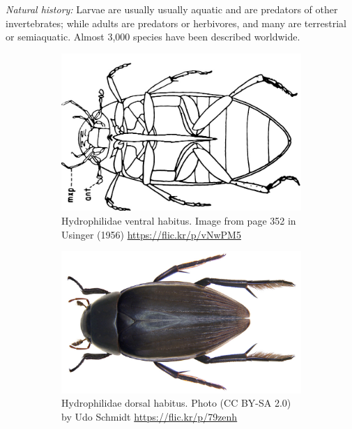 \documentclass[letterpaper, 11pt]{article}
\begin{document}
\noindent{}\textit{Natural history:} Larvae are usually usually aquatic and are predators of other invertebrates; while adults are predators or herbivores, and many are terrestrial or semiaquatic. Almost 3,000 species have been described worldwide.

\begin{figure}[ht!]
  \centering
\begin{subfigure}[ht!]{0.4\textwidth}
    \includegraphics[width=\textwidth]{Hydrophilid1}
  \caption{Hydrophilidae ventral habitus. Image from  page 352 in Usinger (1956) \url{https://flic.kr/p/vNwPM5}}
  \label{fig:hydrophilid1}
\end{subfigure}
    \qquad
\begin{subfigure}[ht!]{0.45\textwidth}
    \includegraphics[width=\textwidth]{Hydrophilid2}
  \caption{Hydrophilidae dorsal habitus. Photo (CC BY-SA 2.0) by Udo Schmidt \url{https://flic.kr/p/79zenh}}
  \label{fig:hydrophilid2}
\end{subfigure}
    \caption{}\label{fig:hydrophilids}
\end{figure}
\end{document}
